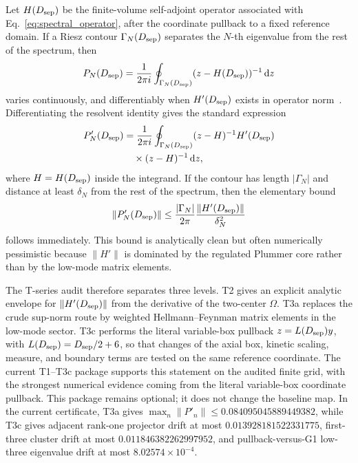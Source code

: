 \documentclass[pdflatex,sn-mathphys-num,iicol]{sn-jnl}
\newcommand{\dd}{\mathrm{d}}
\newcommand{\Dsep}{D_{\rm sep}}
\newcommand{\ReleaseTThreeAMaxProjectorDerivative}{0.084095045889449382}
\newcommand{\ReleaseTThreeCRankOneDrift}{0.013928181522331775}
\newcommand{\ReleaseTThreeCClusterDrift}{0.011846382262997952}
\newcommand{\ReleaseTThreeCLambdaDrift}{8.02574\times 10^{-4}}
\begin{document}
Let \(H(\Dsep)\) be the finite-volume self-adjoint operator associated with Eq.~\eqref{eq:spectral_operator}, after the coordinate pullback to a fixed reference domain.
If a Riesz contour \(\Gamma_N(\Dsep)\) separates the \(N\)-th eigenvalue from the rest of the spectrum, then
\begin{equation}
    P_N(\Dsep)=\frac{1}{2\pi i}\oint_{\Gamma_N(\Dsep)}(z-H(\Dsep))^{-1}\,\dd z
    \label{eq:riesz_projector}
\end{equation}
varies continuously, and differentiably when \(H'(\Dsep)\) exists in operator norm~\cite{Kato1995}.
Differentiating the resolvent identity gives the standard expression
\begin{equation}
    \begin{aligned}
    P_N'(\Dsep)
    &=
    \frac{1}{2\pi i}
    \oint_{\Gamma_N(\Dsep)}
    (z-H)^{-1}H'(\Dsep)
    \\
    &\quad\times
    (z-H)^{-1}
    \,\dd z,
    \end{aligned}
    \label{eq:projector_derivative}
\end{equation}
where \(H=H(\Dsep)\) inside the integrand.
If the contour has length \(|\Gamma_N|\) and distance at least \(\delta_N\) from the rest of the spectrum, then the elementary bound
\begin{equation}
    \|P_N'(\Dsep)\|
    \le
    \frac{|\Gamma_N|}{2\pi}
    \frac{\|H'(\Dsep)\|}{\delta_N^2}
    \label{eq:projector_derivative_bound}
\end{equation}
follows immediately.
This bound is analytically clean but often numerically pessimistic because \(\|H'\|\) is dominated by the regulated Plummer core rather than by the low-mode matrix elements.

The T-series audit therefore separates three levels.
T2 gives an explicit analytic envelope for \(\|H'(\Dsep)\|\) from the derivative of the two-center \(\Omega\).
T3a replaces the crude sup-norm route by weighted Hellmann--Feynman matrix elements in the low-mode sector.
T3c performs the literal variable-box pullback \(z=L(\Dsep)y\), with \(L(\Dsep)=\Dsep/2+6\), so that changes of the axial box, kinetic scaling, measure, and boundary terms are tested on the same reference coordinate.
The current T1--T3c package supports this statement on the audited finite grid, with the strongest numerical evidence coming from the literal variable-box coordinate pullback.
This package remains optional; it does not change the baseline map.
In the current certificate, T3a gives \(\max_n\|P'_n\|\le \ReleaseTThreeAMaxProjectorDerivative\), while T3c gives adjacent rank-one projector drift at most \(\ReleaseTThreeCRankOneDrift\), first-three cluster drift at most \(\ReleaseTThreeCClusterDrift\), and pullback-versus-G1 low-three eigenvalue drift at most \(\ReleaseTThreeCLambdaDrift\).
\end{document}
